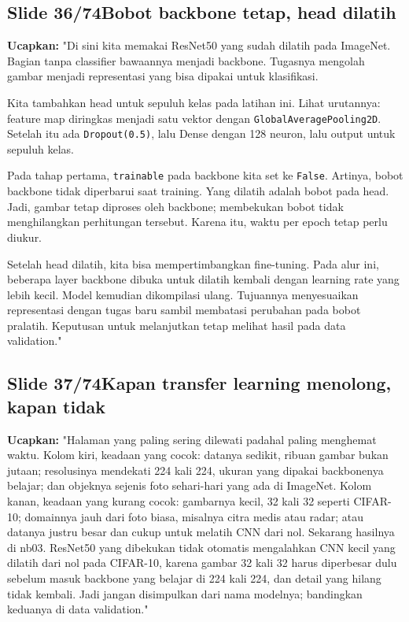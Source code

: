 \documentclass[11pt]{article}
\renewcommand{\framebox}[1]{\colorbox{acc!15}{\textcolor{acc}{\textbf{#1}}}}
\begin{document}
\subsection*{\framebox{Slide 36/74}\quad Bobot backbone tetap, head dilatih}
\textbf{Ucapkan:} "Di sini kita memakai ResNet50 yang sudah dilatih pada ImageNet. Bagian tanpa classifier bawaannya menjadi backbone. Tugasnya mengolah gambar menjadi representasi yang bisa dipakai untuk klasifikasi.

Kita tambahkan head untuk sepuluh kelas pada latihan ini. Lihat urutannya: feature map diringkas menjadi satu vektor dengan \texttt{GlobalAveragePooling2D}. Setelah itu ada \texttt{Dropout(0.5)}, lalu Dense dengan 128 neuron, lalu output untuk sepuluh kelas.

Pada tahap pertama, \texttt{trainable} pada backbone kita set ke \texttt{False}. Artinya, bobot backbone tidak diperbarui saat training. Yang dilatih adalah bobot pada head. Jadi, gambar tetap diproses oleh backbone; membekukan bobot tidak menghilangkan perhitungan tersebut. Karena itu, waktu per epoch tetap perlu diukur.

Setelah head dilatih, kita bisa mempertimbangkan fine-tuning. Pada alur ini, beberapa layer backbone dibuka untuk dilatih kembali dengan learning rate yang lebih kecil. Model kemudian dikompilasi ulang. Tujuannya menyesuaikan representasi dengan tugas baru sambil membatasi perubahan pada bobot pralatih. Keputusan untuk melanjutkan tetap melihat hasil pada data validation."\\[2pt]

\subsection*{\framebox{Slide 37/74}\quad Kapan transfer learning menolong, kapan tidak}
\textbf{Ucapkan:} "Halaman yang paling sering dilewati padahal paling menghemat waktu. Kolom kiri, keadaan yang cocok: datanya sedikit, ribuan gambar bukan jutaan; resolusinya mendekati 224 kali 224, ukuran yang dipakai backbonenya belajar; dan objeknya sejenis foto sehari-hari yang ada di ImageNet. Kolom kanan, keadaan yang kurang cocok: gambarnya kecil, 32 kali 32 seperti CIFAR-10; domainnya jauh dari foto biasa, misalnya citra medis atau radar; atau datanya justru besar dan cukup untuk melatih CNN dari nol. Sekarang hasilnya di nb03. ResNet50 yang dibekukan tidak otomatis mengalahkan CNN kecil yang dilatih dari nol pada CIFAR-10, karena gambar 32 kali 32 harus diperbesar dulu sebelum masuk backbone yang belajar di 224 kali 224, dan detail yang hilang tidak kembali. Jadi jangan disimpulkan dari nama modelnya; bandingkan keduanya di data validation."\\[2pt]
\end{document}
